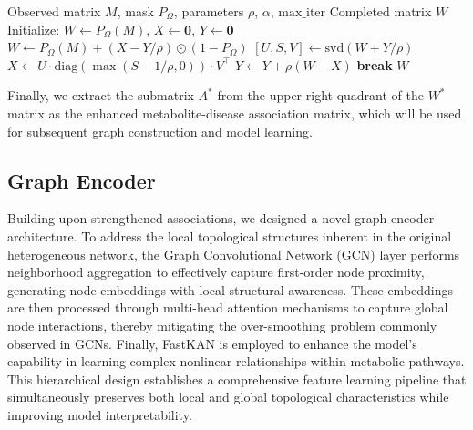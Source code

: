\documentclass[a4paper,fleqn]{cas-dc}
\begin{document}
\begin{algorithm}[H]
	\caption{ADMM for Matrix Completion}
	\label{admm}
	\begin{algorithmic}[1]
		\Require Observed matrix $M$, mask $P_\Omega$, parameters $\rho$, $\alpha$, $\mathrm{max\_iter}$
		\Ensure Completed matrix $W$
		\State Initialize: $W \gets P_\Omega(M)$, $X \gets \mathbf{0}$, $Y \gets \mathbf{0}$
		\State $W \gets P_\Omega(M) + (X - Y/\rho) \odot (1 - P_\Omega)$
		\State $[U,S,V] \gets \mathrm{svd}(W + Y/\rho)$
		\State $X \gets U \cdot \mathrm{diag}(\max(S - 1/\rho, 0)) \cdot V^\top$ 
		\State $Y \gets Y + \rho(W - X)$ 
		\State \textbf{break}
		\EndIf
		\EndFor
		\State \Return $W$
	\end{algorithmic}
\end{algorithm}
Finally, we extract the submatrix \(A^*\) from the upper-right quadrant of the \(W^*\) matrix as the enhanced metabolite-disease association matrix, which will be used for subsequent graph construction and model learning.

\subsection{Graph Encoder}
Building upon strengthened associations, we designed a novel graph encoder architecture. To address the local topological structures inherent in the original heterogeneous network, the Graph Convolutional Network (GCN) layer performs neighborhood aggregation to effectively capture first-order node proximity, generating node embeddings with local structural awareness. These embeddings are then processed through multi-head attention mechanisms to capture global node interactions, thereby mitigating the over-smoothing problem commonly observed in GCNs. Finally, FastKAN is employed to enhance the model's capability in learning complex nonlinear relationships within metabolic pathways. This hierarchical design establishes a comprehensive feature learning pipeline that simultaneously preserves both local and global topological characteristics while improving model interpretability.
\end{document}
